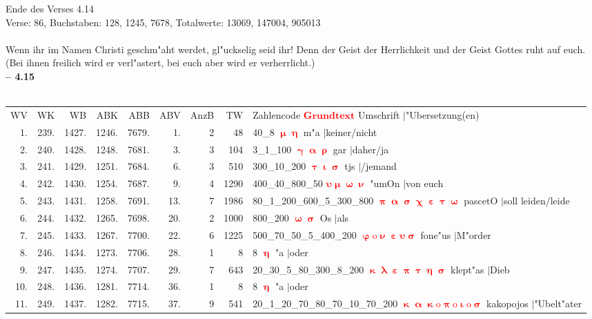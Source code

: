 \documentclass[a4paper,10pt,landscape]{article}
\begin{document}
Ende des Verses 4.14\\
Verse: 86, Buchstaben: 128, 1245, 7678, Totalwerte: 13069, 147004, 905013\\
\\
Wenn ihr im Namen Christi geschm"aht werdet, gl"uckselig seid ihr! Denn der Geist der Herrlichkeit und der Geist Gottes ruht auf euch. (Bei ihnen freilich wird er verl"astert, bei euch aber wird er verherrlicht.)\\
\newpage 
{\bf -- 4.15}\\
\medskip \\
\begin{tabular}{rrrrrrrrp{120mm}}
WV&WK&WB&ABK&ABB&ABV&AnzB&TW&Zahlencode \textcolor{red}{$\boldsymbol{Grundtext}$} Umschrift $|$"Ubersetzung(en)\\
1.&239.&1427.&1246.&7679.&1.&2&48&40\_8 \textcolor{red}{$\boldsymbol{\upmu\upeta}$} m"a $|$keiner/nicht\\
2.&240.&1428.&1248.&7681.&3.&3&104&3\_1\_100 \textcolor{red}{$\boldsymbol{\upgamma\upalpha\uprho}$} gar $|$daher/ja\\
3.&241.&1429.&1251.&7684.&6.&3&510&300\_10\_200 \textcolor{red}{$\boldsymbol{\uptau\upiota\upsigma}$} tjs $|$/jemand\\
4.&242.&1430.&1254.&7687.&9.&4&1290&400\_40\_800\_50 \textcolor{red}{$\boldsymbol{\upsilon\upmu\upomega\upnu}$} "umOn $|$von euch\\
5.&243.&1431.&1258.&7691.&13.&7&1986&80\_1\_200\_600\_5\_300\_800 \textcolor{red}{$\boldsymbol{\uppi\upalpha\upsigma\upchi\upepsilon\uptau\upomega}$} pascetO $|$soll leiden/leide\\
6.&244.&1432.&1265.&7698.&20.&2&1000&800\_200 \textcolor{red}{$\boldsymbol{\upomega\upsigma}$} Os $|$als\\
7.&245.&1433.&1267.&7700.&22.&6&1225&500\_70\_50\_5\_400\_200 \textcolor{red}{$\boldsymbol{\upvarphi\mathrm{o}\upnu\upepsilon\upsilon\upsigma}$} fone"us $|$M"order\\
8.&246.&1434.&1273.&7706.&28.&1&8&8 \textcolor{red}{$\boldsymbol{\upeta}$} "a $|$oder\\
9.&247.&1435.&1274.&7707.&29.&7&643&20\_30\_5\_80\_300\_8\_200 \textcolor{red}{$\boldsymbol{\upkappa\uplambda\upepsilon\uppi\uptau\upeta\upsigma}$} klept"as $|$Dieb\\
10.&248.&1436.&1281.&7714.&36.&1&8&8 \textcolor{red}{$\boldsymbol{\upeta}$} "a $|$oder\\
11.&249.&1437.&1282.&7715.&37.&9&541&20\_1\_20\_70\_80\_70\_10\_70\_200 \textcolor{red}{$\boldsymbol{\upkappa\upalpha\upkappa\mathrm{o}\uppi\mathrm{o}\upiota\mathrm{o}\upsigma}$} kakopojos $|$"Ubelt"ater\\

\end{tabular}
\end{document}
